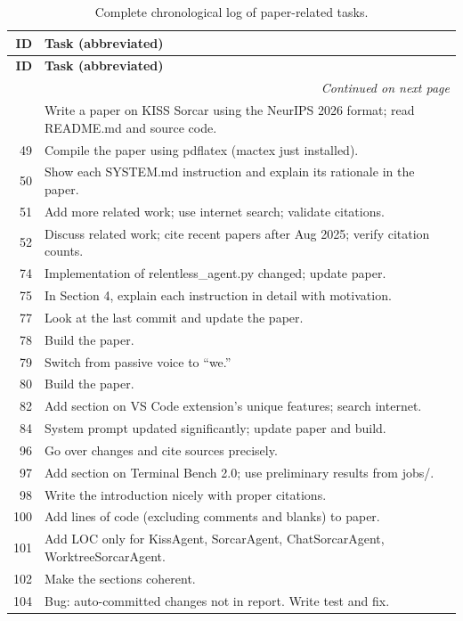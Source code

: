\documentclass{article}
\begin{document}
\begin{longtable}{rp{}}
\caption{Complete chronological log of paper-related tasks.} \label{tab:log} \\
\toprule
\textbf{ID} & \textbf{Task (abbreviated)} \\
\midrule
\endfirsthead
\toprule
\textbf{ID} & \textbf{Task (abbreviated)} \\
\midrule
\endhead
\midrule
\multicolumn{2}{r}{\textit{Continued on next page}} \\
\bottomrule
\endfoot
\bottomrule
\endlastfoot
48 & Write a paper on KISS Sorcar using the NeurIPS 2026 format; read README.md and source code. \\
49 & Compile the paper using pdflatex (mactex just installed). \\
50 & Show each SYSTEM.md instruction and explain its rationale in the paper. \\
51 & Add more related work; use internet search; validate citations. \\
52 & Discuss related work; cite recent papers after Aug 2025; verify citation counts. \\
74 & Implementation of relentless\_agent.py changed; update paper. \\
75 & In Section 4, explain each instruction in detail with motivation. \\
77 & Look at the last commit and update the paper. \\
78 & Build the paper. \\
79 & Switch from passive voice to ``we.'' \\
80 & Build the paper. \\
82 & Add section on VS Code extension's unique features; search internet. \\
84 & System prompt updated significantly; update paper and build. \\
96 & Go over changes and cite sources precisely. \\
97 & Add section on Terminal Bench 2.0; use preliminary results from jobs/. \\
98 & Write the introduction nicely with proper citations. \\
100 & Add lines of code (excluding comments and blanks) to paper. \\
101 & Add LOC only for KissAgent, SorcarAgent, ChatSorcarAgent, WorktreeSorcarAgent. \\
102 & Make the sections coherent. \\
104 & Bug: auto-committed changes not in report. Write test and fix. \\

\end{longtable}
\end{document}

